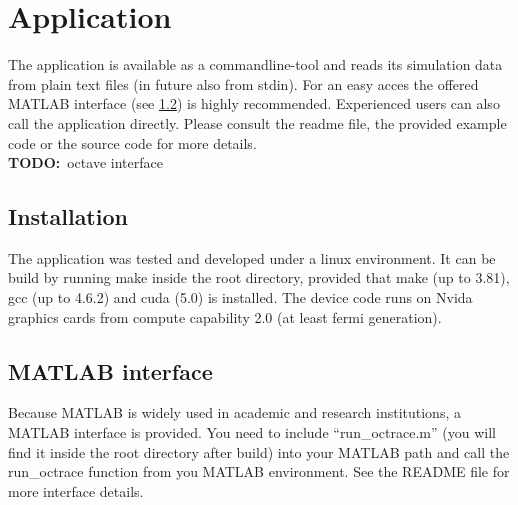 \section{Application}
The application is available as a commandline-tool and reads
its simulation data from plain text files (in future also from stdin).
For an easy acces the offered MATLAB interface (see \ref{label:matlab_interface}) 
is highly recommended. Experienced users can also call the application
directly. Please consult the readme file, the provided 
example code or the source code for more details.\\
\textbf{TODO:}~octave interface

\subsection{Installation}
The application was tested and developed under a linux environment.
It can be build by running make inside the root directory, provided
that make (up to 3.81), gcc (up to 4.6.2) and cuda (5.0) is installed. The device code 
runs on Nvida graphics cards from compute capability 2.0 (at least fermi
generation). 

\subsection{MATLAB interface}
\label{label:matlab_interface}
Because MATLAB is widely used in academic and research institutions, a MATLAB
interface is provided. You need to include ``run\_octrace.m'' (you will find it
inside the root directory after build) into your
MATLAB path and call the run\_octrace function from you MATLAB environment.
See the README file for more interface details.


